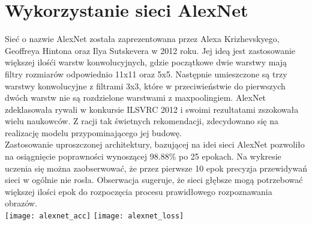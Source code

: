 \section{Wykorzystanie sieci AlexNet}
Sieć o nazwie AlexNet została zaprezentowana przez Alexa Krizhevskyego, Geoffreya Hintona oraz
Ilya Sutskevera w 2012 roku. Jej ideą jest zastosowanie większej ilośći warstw konwolucyjnych,
gdzie początkowe dwie warstwy mają filtry rozmiarów odpowiednio 11x11 oraz 5x5. Następnie
umieszczone są trzy warstwy konwolucyjne z filtrami 3x3, które w przeciwieństwie do pierwszych
dwóch warstw nie są rozdzielone warstwami z maxpoolingiem. AlexNet zdeklasowała rywali
w konkursie ILSVRC 2012 i swoimi rezultatami zszokowała wielu naukowców. Z racji tak świetnych
rekomendacji, zdecydowano się na realizację modelu przypominającego jej budowę.\\
Zastosowanie uproszczonej architektury, bazującej na idei sieci AlexNet pozwoliło
na osiągnięcie poprawności wynoszącej 98.88\% po 25 epokach. Na wykresie uczenia się
można zaobserwować, że przez pierwsze 10 epok precyzja przewidywań sieci w ogólnie nie
rosła. Obserwacja sugeruje, że sieci głębsze mogą potrzebować większej ilości epok
do rozpoczęcia procesu prawidłowego rozpoznawania obrazów.\\
\texttt{[image: alexnet\_acc]}
\texttt{[image: alexnet\_loss]}

